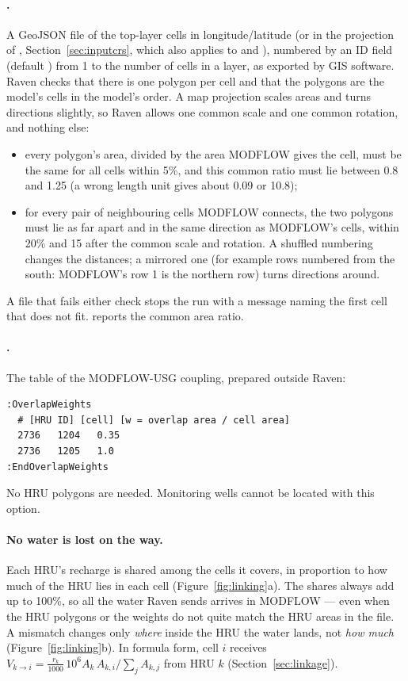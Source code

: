 \paragraph{.} A GeoJSON file of the top-layer cells in longitude/latitude (or in the projection of
, Section~\ref{sec:inputcrs}, which also applies to  and ), numbered by an ID field
(default ) from 1 to the number of cells in a layer, as exported by GIS software. Raven checks that there is one
polygon per cell and that the polygons are the model's cells in the model's order. A map projection scales areas and turns
directions slightly, so Raven allows one common scale and one common rotation, and nothing else:
\begin{itemize}
\item every polygon's area, divided by the area MODFLOW gives the cell, must be the same for all cells within 5\%, and this
      common ratio must lie between 0.8 and 1.25 (a wrong length unit gives about 0.09 or 10.8);
\item for every pair of neighbouring cells MODFLOW connects, the two polygons must lie as far apart and in the same direction
      as MODFLOW's cells, within 20\% and 15\textdegree{} after the common scale and rotation. A shuffled numbering changes
      the distances; a mirrored one (for example rows numbered from the south: MODFLOW's row 1 is the northern row) turns
      directions around.
\end{itemize}
A file that fails either check stops the run with a message naming the first cell that does not fit.
 reports the common area ratio.

\paragraph{.} The table of the MODFLOW-USG coupling, prepared outside Raven:
\begin{lstlisting}
:OverlapWeights
  # [HRU ID] [cell] [w = overlap area / cell area]
  2736   1204   0.35
  2736   1205   1.0
:EndOverlapWeights
\end{lstlisting}
No HRU polygons are needed. Monitoring wells cannot be located with this option.

\paragraph{No water is lost on the way.} Each HRU's recharge is shared among the cells it covers, in proportion to how much of
the HRU lies in each cell (Figure~\ref{fig:linking}a). The shares always add up to 100\%, so all the water Raven sends
arrives in MODFLOW --- even when the HRU polygons or the weights do not quite match the HRU areas in the  file. A
mismatch changes only \emph{where} inside the HRU the water lands, not \emph{how much} (Figure~\ref{fig:linking}b). In
formula form, cell $i$ receives $V_{k\to i}=\frac{r_k}{1000}\,10^{6}A_k\,A_{k,i}/\sum_j A_{k,j}$ from HRU $k$ (Section~\ref{sec:linkage}).

